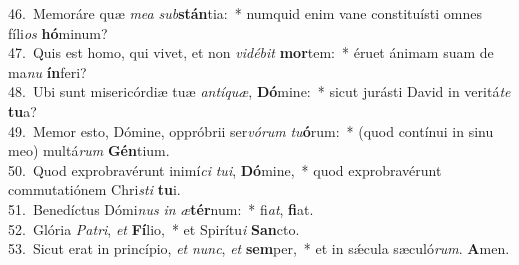 {46.~}Memoráre quæ \textit{me}\textit{a} \textit{sub}\textbf{stán}tia:~* numquid enim vane constituísti omnes fíli\textit{os} \textbf{hó}minum?\\
{47.~}Quis est homo, qui vivet, et non \textit{vi}\textit{dé}\textit{bit} \textbf{mor}tem:~* éruet ánimam suam de ma\textit{nu} \textbf{ín}feri?\\
{48.~}Ubi sunt misericórdiæ tuæ \textit{an}\textit{tí}\textit{quæ}, \textbf{Dó}mine:~* sicut jurásti David in veritá\textit{te} \textbf{tu}a?\\
{49.~}Memor esto, Dómine, oppróbrii ser\textit{vó}\textit{rum} \textit{tu}\textbf{ó}rum:~* (quod contínui in sinu meo) multá\textit{rum} \textbf{Gén}tium.\\
{50.~}Quod exprobravérunt inimí\textit{ci} \textit{tu}\textit{i}, \textbf{Dó}mine,~* quod exprobravérunt commutatiónem Chri\textit{sti} \textbf{tu}i.\\
{51.~}Benedíctus Dómi\textit{nus} \textit{in} \textit{æ}\textbf{tér}num:~* fi\textit{at}, \textbf{fi}at.\\
{52.~}Glória \textit{Pa}\textit{tri}, \textit{et} \textbf{Fí}lio,~* et Spirítu\textit{i} \textbf{San}cto.\\
{53.~}Sicut erat in princípio, \textit{et} \textit{nunc}, \textit{et} \textbf{sem}per,~* et in sǽcula sæculó\textit{rum}. \textbf{A}men.\\
